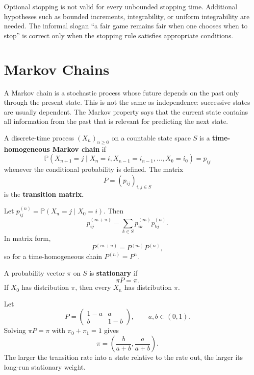\begin{note}
Optional stopping is not valid for every unbounded stopping time. Additional hypotheses such as bounded increments, integrability, or uniform integrability are needed. The informal slogan ``a fair game remains fair when one chooses when to stop'' is correct only when the stopping rule satisfies appropriate conditions.
\end{note}

\section{Markov Chains}

A Markov chain is a stochastic process whose future depends on the past only through the present state. This is not the same as independence: successive states are usually dependent. The Markov property says that the current state contains all information from the past that is relevant for predicting the next state.

\begin{definition}
A discrete-time process $(X_n)_{n\geq0}$ on a countable state space $S$ is a \textbf{time-homogeneous Markov chain} if
\[
\mathbb{P}(X_{n+1}=j\mid X_n=i,X_{n-1}=i_{n-1},\dots,X_0=i_0)
=p_{ij}
\]
whenever the conditional probability is defined. The matrix
\[
    P=(p_{ij})_{i,j\in S}
\]
is the \textbf{transition matrix}.
\end{definition}

\begin{proposition}
Let $p_{ij}^{(n)}=\mathbb{P}(X_n=j\mid X_0=i)$. Then
\[
    p_{ij}^{(m+n)}=
    \sum_{k\in S}p_{ik}^{(m)}p_{kj}^{(n)}.
\]
In matrix form,
\[
    P^{(m+n)}=P^{(m)}P^{(n)},
\]
so for a time-homogeneous chain $P^{(n)}=P^n$.
\end{proposition}

\begin{definition}
A probability vector $\pi$ on $S$ is \textbf{stationary} if
\[
    \pi P=\pi.
\]
If $X_0$ has distribution $\pi$, then every $X_n$ has distribution $\pi$.
\end{definition}

\begin{example}
Let
\[
P=
\begin{pmatrix}
1-a&a\\
b&1-b
\end{pmatrix},
\qquad a,b\in(0,1).
\]
Solving $\pi P=\pi$ with $\pi_0+\pi_1=1$ gives
\[
    \pi=\left(\frac{b}{a+b},\frac{a}{a+b}\right).
\]
The larger the transition rate into a state relative to the rate out, the larger its long-run stationary weight.
\end{example}

